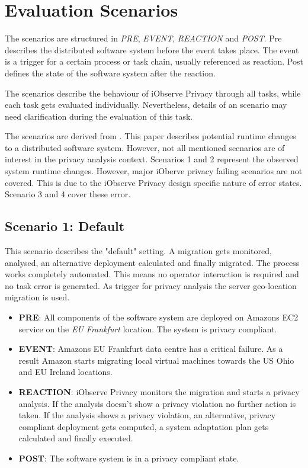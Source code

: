 \section{Evaluation Scenarios}
\label{sec:Evaluation:scenarios}

The scenarios are structured in \textit{PRE}, \textit{EVENT}, \textit{REACTION} and \textit{POST}. Pre describes the distributed software system before the event takes place. The event is a trigger for a certain process or task chain, usually referenced as reaction. Post defines the state of the software system after the reaction.

The scenarios describe the behaviour of iObserve Privacy through all tasks, while each task gets evaluated individually. Nevertheless, details of an scenario may need clarification during the evaluation of this task.

The scenarios are derived from \cite{Heinrich.2016b}. This paper describes potential runtime changes to a distributed software system. However, not all mentioned scenarios are of interest in the privacy analysis context. Scenarios 1 and 2 represent the observed system runtime changes. However, major iOberve privacy failing scenarios are not covered. This is due to the iObserve Privacy design specific nature of error states. Scenario 3 and 4 cover these error.

\subsection{Scenario 1: Default}
\label{eval:scenario:1}
This scenario describes the "default" setting. A migration gets monitored, analysed, an alternative deployment calculated and finally migrated. The process works completely automated. This means no operator interaction is required and no task error is generated. As trigger for privacy analysis the server geo-location migration is used.
\begin{itemize}
	\setlength\itemsep{0em}
	\item \textbf{PRE}: All components of the software system are deployed on Amazons EC2 service on the \textit{EU Frankfurt} location. The system is privacy compliant.
	\item \textbf{EVENT}: Amazons EU Frankfurt data centre has a critical failure. As a result Amazon starts migrating local virtual machines towards the US Ohio and EU Ireland locations.
	\item \textbf{REACTION}: iObserve Privacy monitors the migration and starts a privacy analysis. If the analysis doesn't show a privacy violation no further action is taken. If the analysis shows a privacy violation, an alternative, privacy compliant deployment gets computed, a system adaptation plan gets calculated and finally executed.
	\item \textbf{POST}: The software system is in a privacy compliant state.
\end{itemize}


